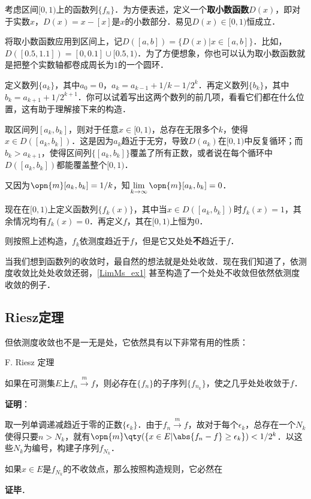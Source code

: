 \begin{example}{}\label{LimMs_ex1}

考虑区间$[0, 1)$上的函数列$\{f_n\}$．为方便表述，定义一个\textbf{取小数函数}$D(x)$，即对于实数$x$，$D(x)=x-[x]$是$x$的小数部分．易见$D(x)\in [0, 1)$恒成立．

将取小数函数应用到区间上，记$D([a, b])=\{D(x)|x\in[a, b]\}$．比如，$D([0.5, 1.1])=[0, 0.1]\cup[0.5, 1)$．为了方便想象，你也可以认为取小数函数就是把整个实数轴都卷成周长为$1$的一个圆环．

定义数列$\{a_k\}$，其中$a_0=0$，$a_k=a_{k-1}+1/k-1/2^k$．再定义数列$\{b_k\}$，其中$b_k=a_{k+1}+1/2^{k+1}$．你可以试着写出这两个数列的前几项，看看它们都在什么位置，这有助于理解接下来的构造．

取区间列$[a_k, b_k]$，则对于任意$x\in[0, 1)$，总存在无限多个$k$，使得$x\in D([a_k, b_k])$．这是因为$a_k$趋近于无穷，导致$D(a_k)$在$[0, 1)$中反复循环；而$b_k>a_{k+1}$，使得区间列$\{[a_k, b_k]\}$覆盖了所有正数，或者说在每个循环中$D([a_k, b_k])$都能覆盖整个$[0, 1)$．

又因为$\opn{m}[a_k, b_k]=1/k$，知$\lim\limits_{k\to \infty}\opn{m}[a_k, b_k]=0$．

现在在$[0, 1)$上定义函数列$\{f_k(x)\}$，其中当$x\in D([a_k, b_k])$时$f_k(x)=1$，其余情况均有$f_k(x)=0$．再定义$f$，其在$[0, 1)$上恒为$0$．

则按照上述构造，$f_k$依测度趋近于$f$，但是它又处处\textbf{不}趋近于$f$．

\end{example}

当我们想到函数列的收敛时，最自然的想法就是处处收敛．现在我们知道了，依测度收敛比处处收敛还弱，\autoref{LimMs_ex1} 甚至构造了一个处处不收敛但依然依测度收敛的例子．


\subsection{Riesz定理}



但依测度收敛也不是一无是处，它依然具有以下非常有用的性质：

\begin{theorem}{F. Riesz 定理}

如果在可测集$E$上$f_n\overset{m}\to f$，则必存在$\{f_n\}$的子序列$\{f_{n_k}\}$，使之几乎处处收敛于$f$．

\end{theorem}

\textbf{证明}：

取一列单调递减趋近于零的正数$\{\epsilon_k\}$．由于$f_n\overset{m}\to f$，故对于每个$\epsilon_k$，总存在一个$N_k$使得只要$n>N_k$，就有$\opn{m}\qty(\{x\in E|\abs{f_n-f}\geq\epsilon_k\})<1/2^k$．以这些$N_k$为编号，构建子序列$f_{N_k}$．

如果$x\in E$是$f_{N_k}$的不收敛点，那么按照构造规则，它必然在



\textbf{证毕}．





